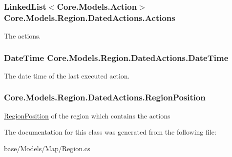 \subsubsection[{Actions}]{\setlength{\rightskip}{0pt plus 5cm}Linked\+List$<${\bf Core.\+Models.\+Action}$>$ Core.\+Models.\+Region.\+Dated\+Actions.\+Actions}\label{classCore_1_1Models_1_1Region_1_1DatedActions_aeaa886f5b32791bbd8d3a98b9712c1e1}


The actions. 

\hypertarget{classCore_1_1Models_1_1Region_1_1DatedActions_aacd25bcefeefe28cab23509157ceafbf}{}
\subsubsection[{Date\+Time}]{\setlength{\rightskip}{0pt plus 5cm}Date\+Time Core.\+Models.\+Region.\+Dated\+Actions.\+Date\+Time}\label{classCore_1_1Models_1_1Region_1_1DatedActions_aacd25bcefeefe28cab23509157ceafbf}


The date time of the last executed action. 

\hypertarget{classCore_1_1Models_1_1Region_1_1DatedActions_af5d142eb58d87b6d923f221b18b3bb20}{}
\subsubsection[{Region\+Position}]{ Core.\+Models.\+Region.\+Dated\+Actions.\+Region\+Position}\label{classCore_1_1Models_1_1Region_1_1DatedActions_af5d142eb58d87b6d923f221b18b3bb20}


\hyperlink{classCore_1_1Models_1_1RegionPosition}{Region\+Position} of the region which contains the actions 



The documentation for this class was generated from the following file\+:\begin{DoxyCompactItemize}
\item 
base/\+Models/\+Map/Region.\+cs\end{DoxyCompactItemize}
